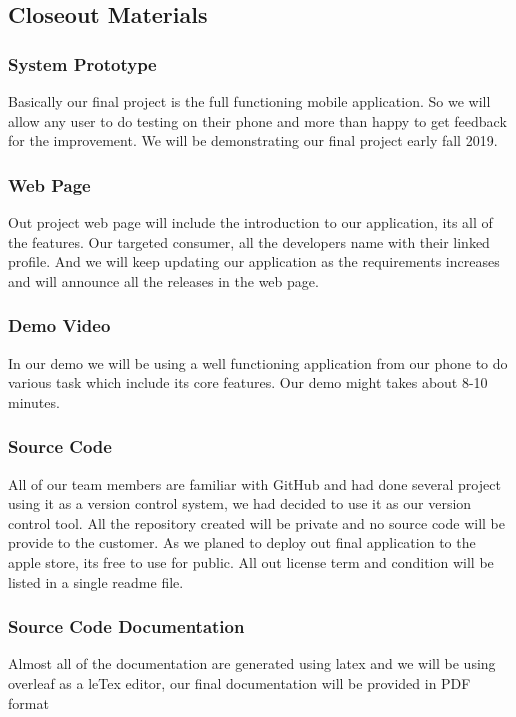 \subsection{Closeout Materials}


\subsubsection{System Prototype}
Basically our final project is the full functioning mobile application. So we will allow any user to do testing on their phone and more than happy to get feedback for the improvement. We will be demonstrating our final project early fall 2019. 


\subsubsection{Web Page}
Out project web page will include the introduction to our application, its all of the features. Our targeted consumer, all the developers name with their linked profile. And we will keep updating our application as the requirements increases and will announce all the releases in the web page.


\subsubsection{Demo Video}
In our demo we will be using a well functioning application from our phone to do various task which include its core features. Our demo might takes about 8-10 minutes.


\subsubsection{Source Code}
All of our team members are familiar with GitHub and had done several project using it as a version control system, we had decided to use it as our version control tool. All the repository created will be private and no source code will be provide to the customer. As we planed to deploy out final application to the apple store, its free to use for public. All out license term and condition will be listed in a single readme file.


\subsubsection{Source Code Documentation}
Almost all  of the documentation are generated using latex and we will be using overleaf as a leTex editor, our final documentation will be provided in PDF format



